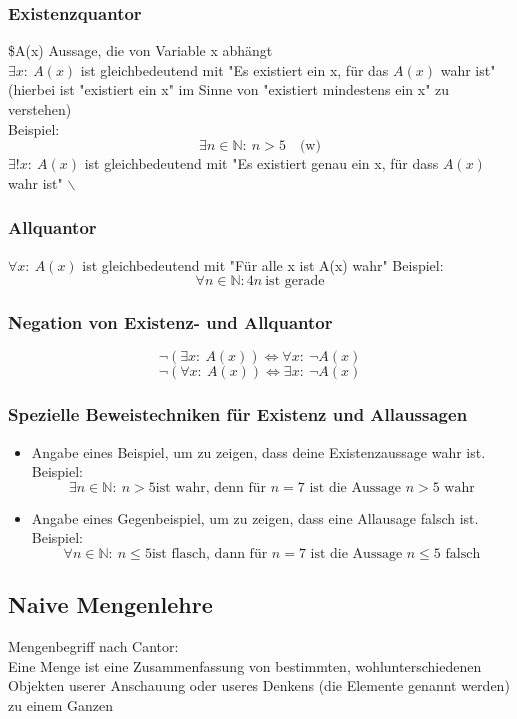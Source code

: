 \documentclass[11pt]{article}
\DeclareMathOperator{\Forall}{\forall}
\begin{document}
\subsubsection{Existenzquantor}
\label{sec-2-3-1}
\$A(x) Aussage, die von Variable x abhängt \\
    $\exists x:~A(x)$ ist gleichbedeutend mit "Es existiert ein x, für das $A(x)$ wahr ist" (hierbei ist "existiert ein x" im Sinne von "existiert mindestens ein x" zu verstehen) \\
    Beispiel:
\[\exists n\in\mathbb{N}:~n>5\quad\text{(w)}\]
$\exists !x:~A(x)$ ist gleichbedeutend mit "Es existiert genau ein x, für dass $A(x)$ wahr ist" $\backslash$
\subsubsection{Allquantor}
\label{sec-2-3-2}
$\Forall x:~A(x)$ ist gleichbedeutend mit "Für alle x ist A(x) wahr"
Beispiel:
\[\Forall n\in\mathbb{N}: 4n~\text{ist gerade}\]
\subsubsection{Negation von Existenz- und Allquantor}
\label{sec-2-3-3}
\[\neg(\exists x:~A(x)) \Leftrightarrow \Forall x:~\neg A(x)\]
\[\neg(\Forall x:~A(x)) \Leftrightarrow \exists x:~\neg A(x)\]
\subsubsection{Spezielle Beweistechniken für Existenz und Allaussagen}
\label{sec-2-3-4}
\begin{itemize}
\item Angabe eines Beispiel, um zu zeigen, dass deine Existenzaussage wahr ist. \\
      Beispiel:
\[\exists n\in\mathbb{N}:~n>5 \text{ist wahr, denn für $n = 7$ ist die Aussage $n > 5$ wahr}\]
\item Angabe eines Gegenbeispiel, um zu zeigen, dass eine Allausage falsch ist. \\
      Beispiel:
\[\Forall n\in\mathbb{N}:~n\leq 5 \text{ist flasch, dann für $n=7$ ist die Aussage $n\leq 5$ falsch}\]
\end{itemize}
\subsection{Naive Mengenlehre}
\label{sec-2-4}
Mengenbegriff nach Cantor: \\
   Eine Menge ist eine Zusammenfassung von bestimmten, wohlunterschiedenen Objekten userer Anschauung oder useres Denkens (die Elemente genannt werden) zu einem Ganzen
\end{document}
